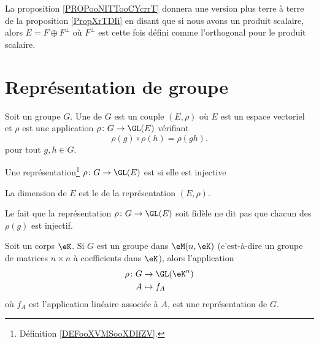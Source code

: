 La proposition \ref{PROPooNITTooCYcrrT} donnera une version plus terre à terre de la proposition \ref{PropXrTDIi} en disant que si nous avons un produit scalaire, alors \( E=F\oplus F^{\perp}\) où \( F^{\perp}\) est cette fois défini comme l'orthogonal pour le produit scalaire.

\section{Représentation de groupe}

\begin{definition}[Représentation]      \label{DEFooXVMSooXDIfZV}
	Soit un groupe \( G\). Une  de \( G\) est un couple \( (E,\rho)\) où \( E\) est un espace vectoriel et \( \rho\) est une application \( \rho\colon G\to \GL(E)\) vérifiant
	\begin{equation}
		\rho(g)\circ\rho(h)=\rho(gh).
	\end{equation}
	pour tout \( g,h\in G\).
\end{definition}

\begin{definition}
	Une représentation\footnote{Définition \ref{DEFooXVMSooXDIfZV}.} \( \rho\colon G\to \GL(E)\) est  si elle est injective

	La dimension de \( E\) est le  de la représentation \( (E,\rho)\).
\end{definition}

Le fait que la représentation \( \rho\colon G \to \GL(E)\) soit fidèle ne dit pas que chacun des \( \rho(g)\) est injectif.

\begin{proposition}     \label{PROPooHNQOooSzeEFG}
	Soit un corps \( \eK\). Si \( G\) est un groupe dans \( \eM(n,\eK)\) (c'est-à-dire un groupe de matrices \( n\times n\) à coefficients dans \( \eK\)), alors l'application
	\begin{equation}
		\begin{aligned}
			\rho\colon G & \to \GL(\eK^n) \\
			A            & \mapsto f_A
		\end{aligned}
	\end{equation}
	où \( f_A\) est l'application linéaire associée à \( A\), est une représentation de \( G\).
\end{proposition}

